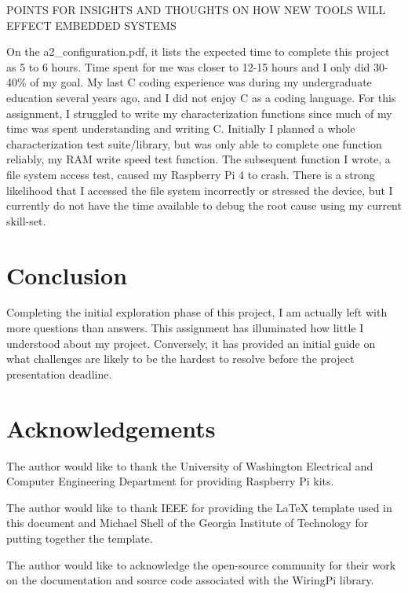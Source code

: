 \documentclass[journal]{IEEEtran}
\begin{document}
    POINTS FOR INSIGHTS AND THOUGHTS ON HOW NEW TOOLS WILL EFFECT EMBEDDED SYSTEMS

    On the a2\_configuration.pdf, it lists the expected time to complete this project as 5 to 6 hours.
    Time spent for me was closer to 12-15 hours and I only did 30-40\% of my goal.
    My last C coding experience was during my undergraduate education several years ago, and I did not enjoy C as a coding language.
    For this assignment, I struggled to write my characterization functions since much of my time was spent understanding and writing C.
    Initially I planned a whole characterization test suite/library, but was only able to complete one function reliably, my RAM write speed test function.
    The subsequent function I wrote, a file system access test, caused my Raspberry Pi 4 to crash.
    There is a strong likelihood that I accessed the file system incorrectly or stressed the device, but I currently do not have the time available to debug the root cause using my current skill-set.  


    \section{Conclusion}
    Completing the initial exploration phase of this project, I am actually left with more questions than answers.
    This assignment has illuminated how little I understood about my project.
    Conversely, it has provided an initial guide on what challenges are likely to be the hardest to resolve before the project presentation deadline.

    \nocite{*}
    \newpage

    
    

    \newpage
    \section{Acknowledgements}
    The author would like to thank the University of Washington Electrical and Computer Engineering Department for providing Raspberry Pi kits.

    The author would like to thank IEEE for providing the LaTeX template used in this document and Michael Shell of the Georgia Institute of Technology for putting together the template.

    The author would like to acknowledge the open-source community for their work on the documentation and source code associated with the WiringPi library. 
\end{document}
